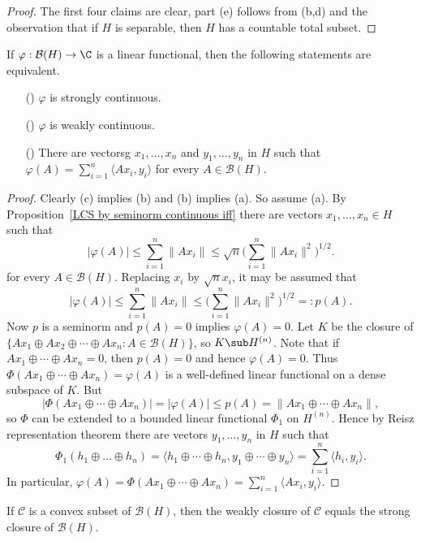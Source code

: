 \begin{proof}
The first four claims are clear, part (e) follows from (b,d) and the observation that if $H$ is separable, then $H$ has a countable total subset.
\end{proof}
\begin{proposition}\label{Hilbert space dual of B(H) strong and weak}
If $\varphi:\mathcal{B}(H)\to\C$ is a linear functional, then the following statements are equivalent.
\begin{itemize}
\item[(\rmnum{1})] $\varphi$ is strongly continuous. 
\item[(\rmnum{2})] $\varphi$ is weakly continuous.
\item[(\rmnum{3})] There are vectorsg $x_1,\dots,x_n$ and $y_1,\dots,y_n$ in $H$ such that $\varphi(A)=\sum_{i=1}^{n}\langle Ax_i,y_i\rangle$ for every $A\in\mathcal{B}(H)$. 
\end{itemize}
\end{proposition}
\begin{proof}
Clearly (c) implies (b) and (b) implies (a). So assume (a). By Proposition~\ref{LCS by seminorm continuous iff} there are vectors $x_1,\dots,x_n\in H$ such that
\[|\varphi(A)|\leq\sum_{i=1}^{n}\|Ax_i\|\leq\sqrt{n}\Big(\sum_{i=1}^{n}\|Ax_i\|^2\Big)^{1/2}.\]
for every $A\in\mathcal{B}(H)$. Replacing $x_i$ by $\sqrt{n}x_i$, it may be assumed that
\[|\varphi(A)|\leq\sum_{i=1}^{n}\|Ax_i\|\leq\Big(\sum_{i=1}^{n}\|Ax_i\|^2\Big)^{1/2}=:p(A).\]
Now $p$ is a seminorm and $p(A)=0$ implies $\varphi(A)=0$. Let $K$ be the closure of $\{Ax_1\oplus Ax_2\oplus\cdots\oplus Ax_n:A\in\mathcal{B}(H)\}$, so $K\sub H^{(n)}$. Note that if $Ax_1\oplus\cdots\oplus Ax_n=0$, then $p(A)=0$ and hence $\varphi(A)=0$. Thus $\Phi(Ax_1\oplus\cdots\oplus Ax_n)=\varphi(A)$ is a well-defined linear functional on a dense subspace of $K$. But
\[|\Phi(Ax_1\oplus\cdots\oplus Ax_n)|=|\varphi(A)|\leq p(A)=\|Ax_1\oplus\cdots\oplus Ax_n\|,\]
so $\Phi$ can be extended to a bounded linear functional $\Phi_1$ on $H^{(n)}$. Hence by Reisz representation theorem there are vectors $y_1,\dots,y_n$ in $H$ such that
\[\Phi_1(h_1\oplus\dots\oplus h_n)=\langle h_1\oplus\cdots\oplus h_n,y_1\oplus\cdots\oplus y_n\rangle=\sum_{i=1}^{n}\langle h_i,y_i\rangle.\]
In particular, $\varphi(A)=\Phi(Ax_1\oplus\cdots\oplus Ax_n)=\sum_{i=1}^{n}\langle Ax_i,y_i\rangle$.
\end{proof}
\begin{corollary}
If $\mathscr{C}$ is a convex subset of $\mathcal{B}(H)$, then the weakly closure of $\mathscr{C}$ equals the strong closure of $\mathcal{B}(H)$.
\end{corollary}
